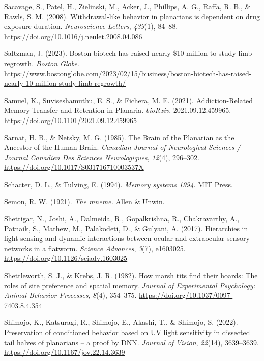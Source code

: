\documentclass[
  jou,
  floatsintext,
  longtable,
  nolmodern,
  notxfonts,
  notimes,
  donotrepeattitle,
  colorlinks=true,linkcolor=blue,citecolor=blue,urlcolor=blue]{apa7}
\newlength{\cslhangindent}
\newenvironment{CSLReferences}[2] %
 {\begin{list}{}{%
  \setlength{\itemindent}{0pt}
  \setlength{\leftmargin}{0pt}
  \setlength{\parsep}{0pt}
  \ifodd #1
   \setlength{\leftmargin}{\cslhangindent}
   \setlength{\itemindent}{-1\cslhangindent}
  \fi
  \setlength{\itemsep}{#2\baselineskip}}}
 {\end{list}}
\begin{document}
\begin{CSLReferences}{1}{0}
Sacavage, S., Patel, H., Zielinski, M., Acker, J., Phillips, A. G.,
Raffa, R. B., \& Rawls, S. M. (2008). Withdrawal-like behavior in
planarians is dependent on drug exposure duration. \emph{Neuroscience
Letters}, \emph{439}(1), 84--88.
\url{https://doi.org/10.1016/j.neulet.2008.04.086}

Saltzman, J. (2023). Boston biotech has raised nearly \$10 million to
study limb regrowth. \emph{Boston Globe}.
\url{https://www.bostonglobe.com/2023/02/15/business/boston-biotech-has-raised-nearly-10-million-study-limb-regrowth/}

Samuel, K., Suviseshamuthu, E. S., \& Fichera, M. E. (2021).
Addiction-{Related} {Memory} {Transfer} and {Retention} in {Planaria}.
\emph{bioRxiv}, 2021.09.12.459965.
\url{https://doi.org/10.1101/2021.09.12.459965}

Sarnat, H. B., \& Netsky, M. G. (1985). The {Brain} of the {Planarian}
as the {Ancestor} of the {Human} {Brain}. \emph{Canadian Journal of
Neurological Sciences / Journal Canadien Des Sciences Neurologiques},
\emph{12}(4), 296--302. \url{https://doi.org/10.1017/S031716710003537X}

Schacter, D. L., \& Tulving, E. (1994). \emph{Memory systems 1994}. MIT
Press.

Semon, R. W. (1921). \emph{The mneme.} Allen \& Unwin.

Shettigar, N., Joshi, A., Dalmeida, R., Gopalkrishna, R., Chakravarthy,
A., Patnaik, S., Mathew, M., Palakodeti, D., \& Gulyani, A. (2017).
Hierarchies in light sensing and dynamic interactions between ocular and
extraocular sensory networks in a flatworm. \emph{Science Advances},
\emph{3}(7), e1603025. \url{https://doi.org/10.1126/sciadv.1603025}

Shettleworth, S. J., \& Krebs, J. R. (1982). How marsh tits find their
hoards: {The} roles of site preference and spatial memory. \emph{Journal
of Experimental Psychology: Animal Behavior Processes}, \emph{8}(4),
354--375. \url{https://doi.org/10.1037/0097-7403.8.4.354}

Shimojo, K., Katsuragi, R., Shimojo, E., Akashi, T., \& Shimojo, S.
(2022). Preservation of conditioned behavior based on {UV} light
sensitivity in dissected tail halves of planarians -- a proof by {DNN}.
\emph{Journal of Vision}, \emph{22}(14), 3639--3639.
\url{https://doi.org/10.1167/jov.22.14.3639}


\end{CSLReferences}
\end{document}
